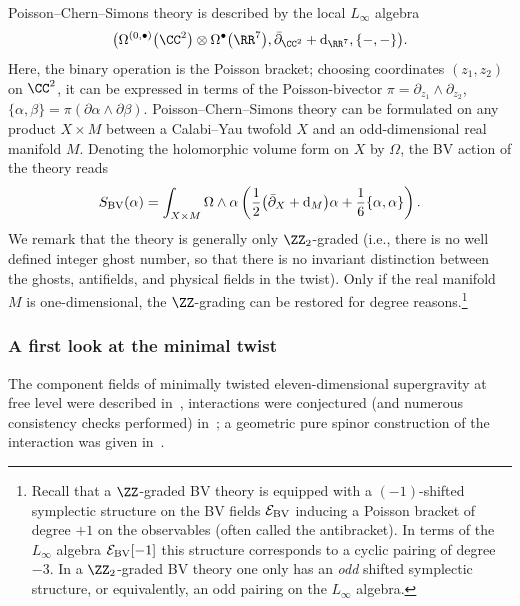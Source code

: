 \documentclass[10pt,a4paper]{amsart}
\numberwithin{equation}{section}
\theoremstyle{definition}
\def\cE{\mathcal E}\def\cF{\mathcal F}\def\cG{\mathcal G}\def\cH{\mathcal H}
\def\d{{\rm d}}
\begin{document}
Poisson--Chern--Simons theory is described by the local $L_\infty$ algebra
\[
 \big( \Omega^{(0,\bullet)}\big(\CC^2\big) \otimes \Omega^\bullet\big(\RR^7\big) , \bar{\partial}_{\CC^2} + \d_{\RR^7} , \{-,-\} \big).
\]
Here, the binary operation is the Poisson bracket; choosing coordinates $(z_1,z_2)$ on $\CC^2$, it can be expressed in terms of the Poisson-bivector $\pi= \partial_{z_1} \wedge \partial_{z_2}$,
$
 \{\alpha,\beta\} = \pi(\partial \alpha \wedge \partial \beta) $.
Poisson--Chern--Simons theory can be formulated on any product $X\times M$ between a Calabi--Yau twofold $X$ and an odd-dimensional real manifold $M$. Denoting the holomorphic volume form on $X$ by $\Omega$, the BV action of the theory reads
\[
	S_{\rm BV}(\alpha) = \int_{X \times M} \Omega \wedge \alpha \left( \frac{1}{2}\big(\bar{\partial}_X + \d_M\big) \alpha + \frac{1}{6} \{ \alpha , \alpha \} \right) .
\]
We remark that the theory is generally only $\ZZ_2$-graded (i.e., there is no well defined integer ghost number, so that there is no invariant distinction between the ghosts, antifields, and physical fields in the twist). Only if the real manifold $M$ is one-dimensional, the $\ZZ$-grading can be restored for degree reasons.\footnote{Recall that a $\ZZ$-graded BV theory is equipped with a $(-1)$-shifted symplectic structure on the BV fields $\cE_{\rm BV}$ inducing a Poisson bracket of degree $+1$ on the observables (often called the antibracket). In terms of the $L_\infty$ algebra $\cE_{\rm BV}[-1]$ this structure corresponds to a cyclic pairing of degree $-3$. In a $\ZZ_2$-graded BV theory one only has an \emph{odd} shifted symplectic structure, or equivalently, an odd pairing on the $L_\infty$ algebra.}

\subsubsection{A first look at the minimal twist}
The component fields of minimally twisted eleven-dimensional supergravity at free level were described in~\cite{Ced-SL5,spinortwist}, interactions were conjectured (and numerous consistency checks performed) in~\cite{RSW}; a geometric pure spinor construction of the interaction was given in~\cite{CY2}.
\end{document}
